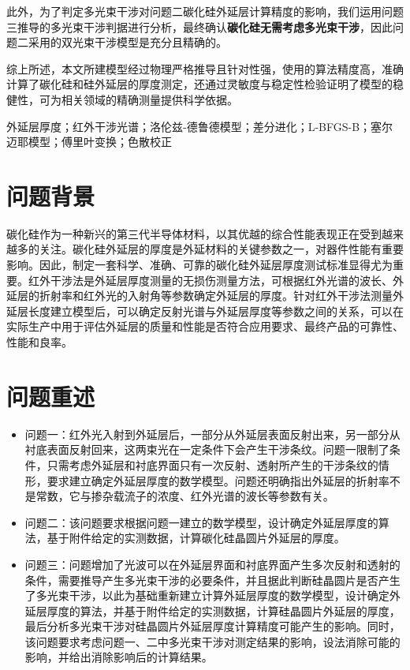 \documentclass[a4paper]{ctexart}
\begin{document}
 此外，为了判定多光束干涉对问题二碳化硅外延层计算精度的影响，我们运用问题三推导的多光束干涉判据进行分析，最终确认\textbf{碳化硅无需考虑多光束干涉}，因此问题二采用的双光束干涉模型是充分且精确的。

综上所述，本文所建模型经过物理严格推导且针对性强，使用的算法精度高，准确计算了碳化硅和硅外延层的厚度测定，还通过灵敏度与稳定性检验证明了模型的稳健性，可为相关领域的精确测量提供科学依据。

\vspace{1cm} %

 外延层厚度；红外干涉光谱；洛伦兹-德鲁德模型；差分进化；L-BFGS-B；塞尔迈耶模型；傅里叶变换；色散校正

\newpage %

\section{问题背景}
碳化硅作为一种新兴的第三代半导体材料，以其优越的综合性能表现正在受到越来越多的关注。碳化硅外延层的厚度是外延材料的关键参数之一，对器件性能有重要影响。因此，制定一套科学、准确、可靠的碳化硅外延层厚度测试标准显得尤为重要。红外干涉法是外延层厚度测量的无损伤测量方法，可根据红外光谱的波长、外延层的折射率和红外光的入射角等参数确定外延层的厚度。针对红外干涉法测量外延层长度建立模型后，可以确定反射光谱与外延层厚度等参数之间的关系，可以在实际生产中用于评估外延层的质量和性能是否符合应用要求、最终产品的可靠性、性能和良率。
\section{问题重述}
\begin{itemize}
    \item 问题一：红外光入射到外延层后，一部分从外延层表面反射出来，另一部分从衬底表面反射回来，这两束光在一定条件下会产生干涉条纹。问题一限制了条件，只需考虑外延层和衬底界面只有一次反射、透射所产生的干涉条纹的情形，要求建立确定外延层厚度的数学模型。问题还明确指出外延层的折射率不是常数，它与掺杂载流子的浓度、红外光谱的波长等参数有关。
    \item 问题二：该问题要求根据问题一建立的数学模型，设计确定外延层厚度的算法，基于附件给定的实测数据，计算碳化硅晶圆片外延层的厚度。
    \item 问题三：问题增加了光波可以在外延层界面和衬底界面产生多次反射和透射的条件，需要推导产生多光束干涉的必要条件，并且据此判断硅晶圆片是否产生了多光束干涉，以此为基础重新建立计算外延层厚度的数学模型，设计确定外延层厚度的算法，并基于附件给定的实测数据，计算硅晶圆片外延层的厚度，最后分析多光束干涉对硅晶圆片外延层厚度计算精度可能产生的影响。同时，该问题要求考虑问题一、二中多光束干涉对测定结果的影响，设法消除可能的影响，并给出消除影响后的计算结果。
\end{itemize}
\end{document}
